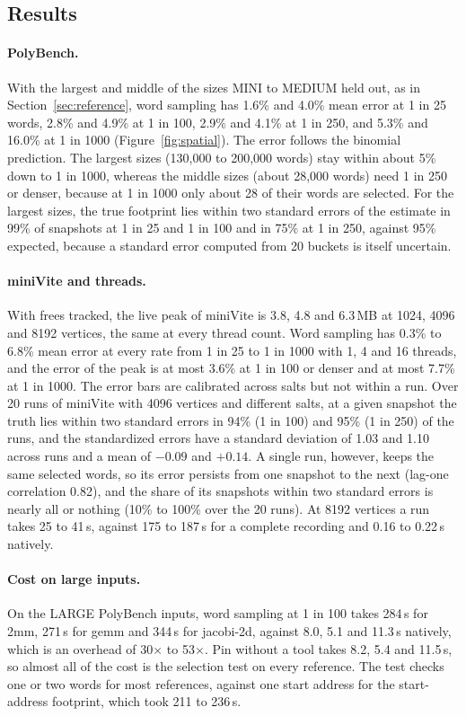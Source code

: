 \documentclass[11pt]{article}
\newcommand{\secref}[1]{Section~\ref{#1}}
\newcommand{\figref}[1]{Figure~\ref{#1}}
\begin{document}
\subsection{Results}

\paragraph{PolyBench.}
With the largest and middle of the sizes MINI to MEDIUM held out, as in \secref{sec:reference}, word sampling has 1.6\% and 4.0\% mean error at 1 in 25 words, 2.8\% and 4.9\% at 1 in 100, 2.9\% and 4.1\% at 1 in 250, and 5.3\% and 16.0\% at 1 in 1000 (\figref{fig:spatial}). The error follows the binomial prediction. The largest sizes (130{,}000 to 200{,}000 words) stay within about 5\% down to 1 in 1000, whereas the middle sizes (about 28{,}000 words) need 1 in 250 or denser, because at 1 in 1000 only about 28 of their words are selected. For the largest sizes, the true footprint lies within two standard errors of the estimate in 99\% of snapshots at 1 in 25 and 1 in 100 and in 75\% at 1 in 250, against 95\% expected, because a standard error computed from 20 buckets is itself uncertain.

\paragraph{miniVite and threads.}
With frees tracked, the live peak of miniVite is 3.8, 4.8 and 6.3\,MB at 1024, 4096 and 8192 vertices, the same at every thread count. Word sampling has 0.3\% to 6.8\% mean error at every rate from 1 in 25 to 1 in 1000 with 1, 4 and 16 threads, and the error of the peak is at most 3.6\% at 1 in 100 or denser and at most 7.7\% at 1 in 1000. The error bars are calibrated across salts but not within a run. Over 20 runs of miniVite with 4096 vertices and different salts, at a given snapshot the truth lies within two standard errors in 94\% (1 in 100) and 95\% (1 in 250) of the runs, and the standardized errors have a standard deviation of 1.03 and 1.10 across runs and a mean of $-0.09$ and $+0.14$. A single run, however, keeps the same selected words, so its error persists from one snapshot to the next (lag-one correlation 0.82), and the share of its snapshots within two standard errors is nearly all or nothing (10\% to 100\% over the 20 runs). At 8192 vertices a run takes 25 to 41\,s, against 175 to 187\,s for a complete recording and 0.16 to 0.22\,s natively.

\paragraph{Cost on large inputs.}
On the LARGE PolyBench inputs, word sampling at 1 in 100 takes 284\,s for 2mm, 271\,s for gemm and 344\,s for jacobi-2d, against 8.0, 5.1 and 11.3\,s natively, which is an overhead of 30$\times$ to 53$\times$. Pin without a tool takes 8.2, 5.4 and 11.5\,s, so almost all of the cost is the selection test on every reference. The test checks one or two words for most references, against one start address for the start-address footprint, which took 211 to 236\,s.
\end{document}
